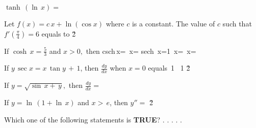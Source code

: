 \documentclass[amsfonts,bezier,leqno,fleqn,12pt,a4paper]{article}
\begin{document}
{{{\begin{large}
\item %
$\displaystyle \tanh \, (\ln\,x)=$
\sc
\be
\displaystyle {}
\ee
\be
\displaystyle {}
\ee
\be
\displaystyle {}
\ee
{}
\ee
\be
\displaystyle {}
\ee

\newpage



\item %
Let $f(x)=c\,x+\ln(\cos x)$ where $c$ is a constant. The value of $c$ such that $f'(\displaystyle \frac{\pi}{4})=6$ equals to
\sc
{}
\ee
{}
\ee
{}
\ee
{}
\ee
{}
\ee
\v2



\item %
If $\displaystyle \cosh\,x=\frac{5}{3}$ and $x>0,$ then
\sc
\be
\displaystyle \mbox{csch}\,x=
\ee
\be
\displaystyle \tanh\,x=
\ee
\be
\displaystyle \mbox{sech}\, x=1
\ee
\be
\displaystyle \coth\,x=
\ee
\be
\displaystyle \sinh\,x=
\ee

\newpage



\item %
If $y\,\sec x=x\, \tan y \,+\, 1$, then $\displaystyle {\frac{dy}{dx}}$ when $x=0$ equals
\sc
\be
\displaystyle {}
\ee
\be
\displaystyle {}
\ee
\be
\displaystyle \tan\,1
\ee
{}
\ee
\be
\displaystyle \sec\, 1
\ee
\v2



\item %
If $y=\sqrt{\sin \,x+\,y},$ then $\displaystyle \frac{dy}{dx}=$
\sc
\be
\displaystyle {}
\ee
\be
\displaystyle {}
\ee
\be
\displaystyle {}
\ee
\be
\displaystyle {}
\ee
\be
\displaystyle {}
\ee

\newpage



\item %
If $\displaystyle y=\ln\,(1+\ln\,x)$ and $x>\,e$, then $y''=$
\sc
\be
\displaystyle {}
\ee
\be
\displaystyle {}
\ee
\be
\displaystyle {}
\ee
\be
\displaystyle {}
\ee
\be
\displaystyle {}
\ee
\v2



\item %
Which one of the following statements is \textbf{TRUE}?
\sc
\be
.
\ee
\be
.
\ee
\be
.
\ee
\be
.
\ee
\be
.
\ee


\end{large}}}}
\end{document}
